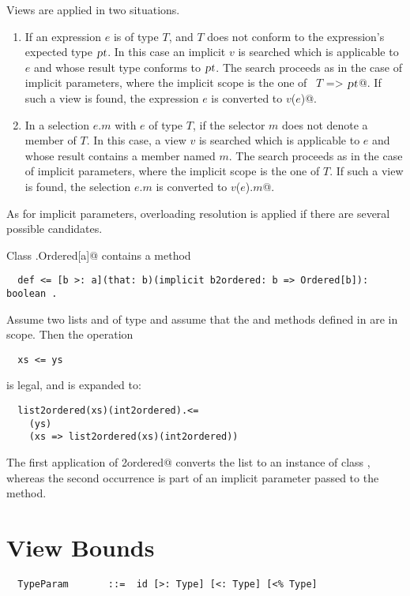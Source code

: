 Views are applied in two situations.
\begin{enumerate}
\item
If an expression $e$ is of type $T$, and $T$ does not conform to the
expression's expected type $\mbox{\sl pt}$. In this case an implicit $v$ is
searched which is applicable to $e$ and whose result type conforms to
$\mbox{\sl pt}$.  The search proceeds as in the case of implicit parameters,
where the implicit scope is the one of ~\lstinline@$T$ => $\mbox{\sl pt}$@. If
such a view is found, the expression $e$ is converted to
\lstinline@$v$($e$)@.
\item
In a selection $e.m$ with $e$ of type $T$, if the selector $m$ does
not denote a member of $T$.  In this case, a view $v$ is searched
which is applicable to $e$ and whose result contains a member named
$m$.  The search proceeds as in the case of implicit parameters, where
the implicit scope is the one of $T$.  If such a view is found, the
selection $e.m$ is converted to \lstinline@$v$($e$).$m$@.
\end{enumerate}
As for implicit parameters, overloading resolution is applied
if there are several possible candidates.

\example\label{ex:impl-ordered} Class \lstinline@scala.Ordered[a]@ contains a method
\begin{lstlisting}
  def <= [b >: a](that: b)(implicit b2ordered: b => Ordered[b]): boolean .
\end{lstlisting}
Assume two lists  and  of type 
and assume that the  and 
methods defined in  are in scope.
Then the operation
\begin{lstlisting}
  xs <= ys
\end{lstlisting}
is legal, and is expanded to:
\begin{lstlisting}
  list2ordered(xs)(int2ordered).<=
    (ys)
    (xs => list2ordered(xs)(int2ordered))
\end{lstlisting}
The first application of \lstinline@list2ordered@ converts the list
 to an instance of class , whereas the second 
occurrence is part of an implicit parameter passed to the \code{<=} method.

\section{View Bounds}\label{sec:view-bounds}

\syntax\begin{lstlisting}
  TypeParam       ::=  id [>: Type] [<: Type] [<% Type]
\end{lstlisting}

